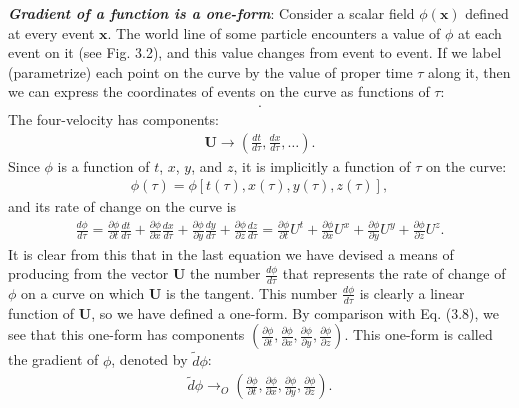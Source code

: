 \documentclass[12pt]{book}
\begin{document}
    \textit{\textbf{Gradient of a function is a one-form}}: Consider a scalar field \(\phi(\mathbf{x})\) defined at every event \(\mathbf{x}\). The world line of some particle encounters a value of \(\phi\) at each event on it (see Fig. 3.2), and this value changes from event to event. If we label (parametrize) each point on the curve by the value of proper time \(\tau\) along it, then we can express the coordinates of events on the curve as functions of \(\tau\):
    \begin{align}
    [t = t(\tau), x = x(\tau), y = y(\tau), z = z(\tau)].
    \end{align}
    The four-velocity has components:
    \begin{align}
    \mathbf{U} \rightarrow \left(\frac{d t}{d\tau}, \frac{d x}{d\tau}, \ldots\right).
    \end{align}
    Since \(\phi\) is a function of \(t\), \(x\), \(y\), and \(z\), it is implicitly a function of \(\tau\) on the curve:
    \begin{align}
    \phi(\tau) = \phi[t(\tau), x(\tau), y(\tau), z(\tau)],
    \end{align}
    and its rate of change on the curve is
    \begin{align}
    \frac{d\phi}{d\tau} = \frac{\partial \phi}{\partial t} \frac{d t}{d\tau}
    + \frac{\partial \phi}{\partial x} \frac{d x}{d\tau}
    + \frac{\partial \phi}{\partial y} \frac{d y}{d\tau}
    + \frac{\partial \phi}{\partial z} \frac{d z}{d\tau}
    = \frac{\partial \phi}{\partial t} U^t + \frac{\partial \phi}{\partial x} U^x + \frac{\partial \phi}{\partial y} U^y + \frac{\partial \phi}{\partial z} U^z. \tag{3.14}
    \end{align}
    It is clear from this that in the last equation we have devised a means of producing from the vector \(\mathbf{U}\) the number \( \frac{d\phi}{d\tau} \) that represents the rate of change of \(\phi\) on a curve on which \(\mathbf{U}\) is the tangent. This number \( \frac{d\phi}{d\tau} \) is clearly a linear function of \(\mathbf{U}\), so we have defined a one-form. 
    By comparison with Eq. (3.8), we see that this one-form has components \(\left(\frac{\partial \phi}{\partial t}, \frac{\partial \phi}{\partial x}, \frac{\partial \phi}{\partial y}, \frac{\partial \phi}{\partial z}\right)\). This one-form is called the gradient of \(\phi\), denoted by \(\tilde{d}\phi\):
    \begin{align}
    \tilde{d}\phi \rightarrow_O \left(\frac{\partial \phi}{\partial t}, \frac{\partial \phi}{\partial x}, \frac{\partial \phi}{\partial y}, \frac{\partial \phi}{\partial z}\right). \tag{3.15}
    \end{align}
\end{document}
